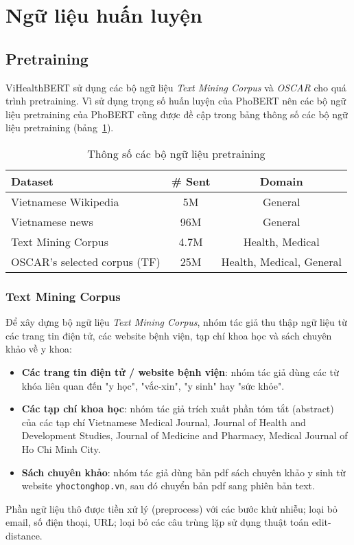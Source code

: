 \section{Ngữ liệu huấn luyện}
\subsection{Pretraining}
ViHealthBERT sử dụng các bộ ngữ liệu \textit{Text Mining Corpus} và \textit{OSCAR} cho quá trình pretraining. Vì sử dụng trọng số huấn luyện của PhoBERT nên các bộ ngữ liệu pretraining của PhoBERT cũng được đề cập trong bảng thông số các bộ ngữ liệu pretraining (bảng~\ref{tab:pretraining-stats}).

\begin{table}[H]
\centering
\begin{tabular}{|l|c|c|}
\hline
\textbf{Dataset} & \textbf{\# Sent} & \textbf{Domain} \\ \hline
Vietnamese Wikipedia & 5M & General \\ \hline
Vietnamese news & 96M & General \\ \hline
Text Mining Corpus & 4.7M & Health, Medical \\ \hline
OSCAR's selected corpus (TF) & 25M  & Health, Medical, General \\ \hline
\end{tabular}
\caption{Thông số các bộ ngữ liệu pretraining\cite{minh-EtAl:2022:LREC}}
\label{tab:pretraining-stats}
\end{table}

\subsubsection{Text Mining Corpus}
Để xây dựng bộ ngữ liệu \textit{Text Mining Corpus}, nhóm tác giả thu thập ngữ liệu từ các trang tin điện tử, các website bệnh viện, tạp chí khoa học và sách chuyên khảo về y khoa:
\begin{itemize}
\item \textbf{Các trang tin điện tử / website bệnh viện}: nhóm tác giả dùng các từ khóa liên quan đến "y học", "vắc-xin", "y sinh" hay "sức khỏe".
\item \textbf{Các tạp chí khoa học}: nhóm tác giả trích xuất phần tóm tắt (abstract) của các tạp chí Vietnamese Medical Journal, Journal of Health and Development Studies, Journal of Medicine and Pharmacy, Medical Journal of Ho Chi Minh City.
\item \textbf{Sách chuyên khảo}: nhóm tác giả dùng bản pdf sách chuyên khảo y sinh từ website \texttt{yhoctonghop.vn}, sau đó chuyển bản pdf sang phiên bản text.
\end{itemize}
Phần ngữ liệu thô được tiền xử lý (preprocess) với các bước khử nhiễu; loại bỏ email, số điện thoại, URL; loại bỏ các câu trùng lặp sử dụng thuật toán edit-distance.


